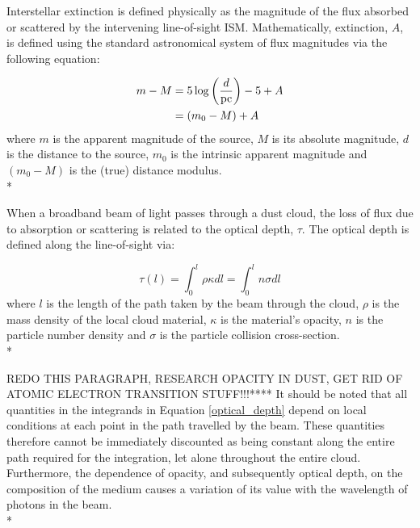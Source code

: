 \documentclass[12pt, a4paper]{report}
\begin{document}


Interstellar extinction is defined physically as the magnitude of the flux absorbed or scattered by the intervening line-of-sight ISM. Mathematically, extinction, $A$, is defined using the standard astronomical system of flux magnitudes via the following equation:

\begin{align}
\begin{split}
m - M &= 5\log\left(\frac{d}{\textnormal{pc}}\right) - 5 + A \\
      &= (m_{0} - M) + A
\end{split}
\label{ext_def_app_mag}
\end{align}
where $m$ is the apparent magnitude of the source, $M$ is its absolute magnitude, $d$ is the distance to the source, $m_{0}$ is the intrinsic apparent magnitude and $(m_{0} - M)$ is the (true) distance modulus. \\*

When a broadband beam of light passes through a dust cloud, the loss of flux due to absorption or scattering is related to the optical depth, $\tau$. The optical depth is defined along the line-of-sight via:

\begin{equation}
\tau(l) = \int_{0}^{l} \rho \kappa dl = \int_{0}^{l} n \sigma dl
\label{optical_depth}
\end{equation}
where $l$ is the length of the path taken by the beam through the cloud, $\rho$ is the mass density of the local cloud material, $\kappa$ is the material's opacity, $n$ is the particle number density and $\sigma$ is the particle collision cross-section.\\*


REDO THIS PARAGRAPH, RESEARCH OPACITY IN DUST, GET RID OF ATOMIC ELECTRON TRANSITION STUFF!!!****
It should be noted that all quantities in the integrands in Equation \ref{optical_depth} depend on local conditions at each point in the path travelled by the beam. These quantities therefore cannot be immediately discounted as being constant along the entire path required for the integration, let alone throughout the entire cloud. Furthermore, the dependence of opacity, and subsequently optical depth, on the composition of the medium causes a variation of its value with the wavelength of photons in the beam.\\*
\end{document}
